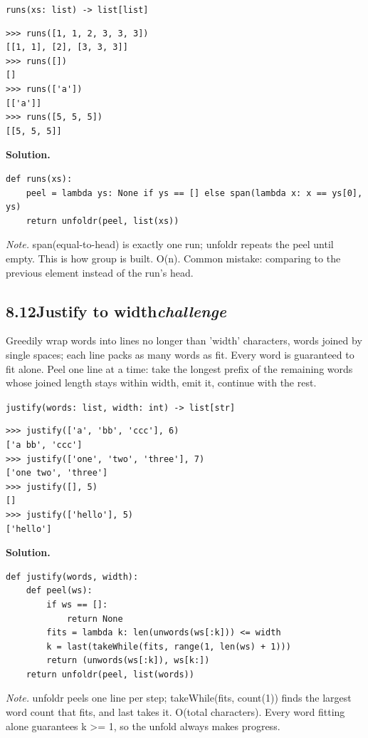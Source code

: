 \documentclass[10pt,letterpaper]{book}
\begin{document}
\noindent\texttt{runs(xs: list) -> list[list]}
\begin{lstlisting}[style=ex]
>>> runs([1, 1, 2, 3, 3, 3])
[[1, 1], [2], [3, 3, 3]]
>>> runs([])
[]
>>> runs(['a'])
[['a']]
>>> runs([5, 5, 5])
[[5, 5, 5]]
\end{lstlisting}
\noindent\textbf{Solution.}
\begin{lstlisting}[style=code]
def runs(xs):
    peel = lambda ys: None if ys == [] else span(lambda x: x == ys[0], ys)
    return unfoldr(peel, list(xs))
\end{lstlisting}
\noindent\textit{Note.} span(equal-to-head) is exactly one run; unfoldr repeats the peel until empty. This is how group is built. O(n). Common mistake: comparing to the previous element instead of the run's head.

\subsection*{8.12\quad Justify to width\hfill\textnormal{\textit{challenge}}}
Greedily wrap words into lines no longer than 'width' characters, words joined by single spaces; each line packs as many words as fit. Every word is guaranteed to fit alone. Peel one line at a time: take the longest prefix of the remaining words whose joined length stays within width, emit it, continue with the rest.

\noindent\texttt{justify(words: list, width: int) -> list[str]}
\begin{lstlisting}[style=ex]
>>> justify(['a', 'bb', 'ccc'], 6)
['a bb', 'ccc']
>>> justify(['one', 'two', 'three'], 7)
['one two', 'three']
>>> justify([], 5)
[]
>>> justify(['hello'], 5)
['hello']
\end{lstlisting}
\noindent\textbf{Solution.}
\begin{lstlisting}[style=code]
def justify(words, width):
    def peel(ws):
        if ws == []:
            return None
        fits = lambda k: len(unwords(ws[:k])) <= width
        k = last(takeWhile(fits, range(1, len(ws) + 1)))
        return (unwords(ws[:k]), ws[k:])
    return unfoldr(peel, list(words))
\end{lstlisting}
\noindent\textit{Note.} unfoldr peels one line per step; takeWhile(fits, count(1)) finds the largest word count that fits, and last takes it. O(total characters). Every word fitting alone guarantees k >= 1, so the unfold always makes progress.

\end{document}
